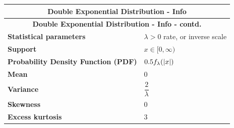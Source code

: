 \renewcommand{\arraystretch}{2}
\begin{longtable}{|m{6cm}|p{9cm}|}
    \hline
    \multicolumn{2}{|c|}{\textbf{Double Exponential Distribution - Info}} \\
    \hline\endfirsthead

    \hline
    \multicolumn{2}{|c|}{\textbf{Double Exponential Distribution - Info - contd.}} \\
    \hline\endhead
    
    \hline\endfoot
    \hline\endlastfoot

    \textbf{Statistical parameters} & 
    ${\displaystyle \lambda >0}$ rate, or inverse scale
    \\ \hline
    
    \textbf{Support} &
    ${\displaystyle x\in [0,\infty )}$
    \\ \hline

    \textbf{Probability Density Function (PDF)} & 
    $0.5f_\lambda(\left| x \right|)$
    \\[1ex] \hline
    
    \textbf{Mean} & 
    $0$
    \\[1ex] \hline

    \textbf{Variance} &
    $\dfrac{2}{\lambda}$
    \\[1ex] \hline

    \textbf{Skewness} &
    $0$
    \\ \hline

    \textbf{Excess kurtosis} &
    $3$
    \\ \hline

\end{longtable}
\renewcommand{\arraystretch}{1}






















